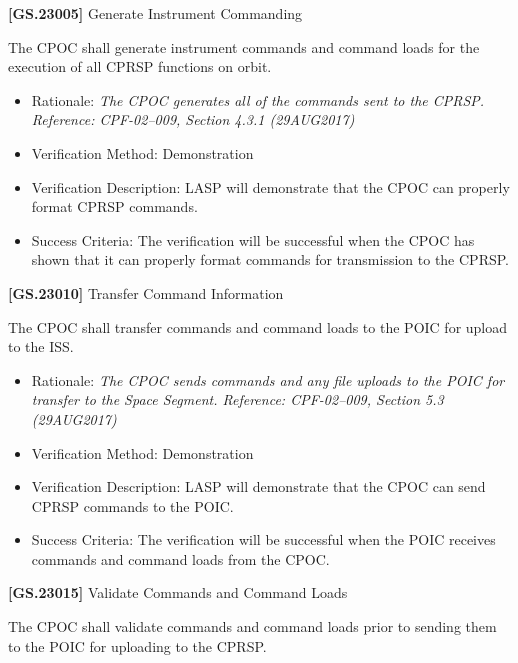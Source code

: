 \label{tbx_1}

\textbf{[GS.23005]} Generate Instrument Commanding

The \gls{CPOC} shall generate instrument commands and command loads for the execution of all \gls{CPRSP} functions on orbit.

\begin{itemize}
\item{} Rationale: \emph{The CPOC generates all of the commands sent to the CPRSP. Reference: CPF-02--009, Section 4.3.1 (29AUG2017)}

\item{} Verification Method: Demonstration

\item{} Verification Description: \gls{LASP} will demonstrate that the \gls{CPOC} can properly format \gls{CPRSP} commands.

\item{} Success Criteria: The verification will be successful when the \gls{CPOC} has shown that it can properly format commands for transmission to the \gls{CPRSP}.

\end{itemize}

\textbf{[GS.23010]} Transfer Command Information

The \gls{CPOC} shall transfer commands and command loads to the \gls{POIC} for upload to the \gls{ISS}.

\begin{itemize}
\item{} Rationale: \emph{The CPOC sends commands and any file uploads to the POIC for transfer to the Space Segment. Reference: CPF-02--009, Section 5.3 (29AUG2017)}

\item{} Verification Method: Demonstration

\item{} Verification Description: \gls{LASP} will demonstrate that the \gls{CPOC} can send \gls{CPRSP} commands to the \gls{POIC}.

\item{} Success Criteria: The verification will be successful when the \gls{POIC} receives commands and command loads from the \gls{CPOC}.

\end{itemize}

\textbf{[GS.23015]} Validate Commands and Command Loads

The \gls{CPOC} shall validate commands and command loads prior to sending them to the \gls{POIC} for uploading to the \gls{CPRSP}.


